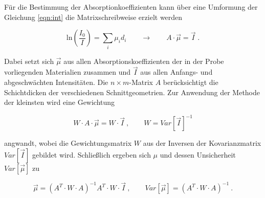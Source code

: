 Für die Bestimmung der Absorptionkoeffizienten kann über eine Umformung der Gleichung \eqref{eqn:int}
die Matrixschreibweise erzielt werden

\begin{equation}
    \text{ln} \left(\frac{I_0}{I}\right) = \sum_i \mu_i d_i \qquad \to \qquad A \cdot \vec{\mu} = \vec{I} \; .
\end{equation}

Dabei setzt sich $\vec{\mu}$ aus allen Absorptionskoeffizienten der in der Probe vorliegenden Materialien zusammen
und $\vec{I}$ aus allen Anfangs- und abgeschwächten Intensitäten. Die $n \times m$-Matrix $A$ berücksichtigt die Schichtdicken
der verschiedenen Schnittgeometrien. 
Zur Anwendung der Methode der kleinsten wird eine Gewichtung 

\begin{equation}
    W \cdot A \cdot \vec{\mu} = W \cdot \vec{I} \:, \qquad W = Var[\vec{I}]^{-1}
\end{equation}

angwandt, wobei die Gewichtungsmatrix $W$ aus der Inversen der Kovarianzmatrix $Var[\vec{I}]$ gebildet wird.
Schließlich ergeben sich $\mu$ und dessen Unsicherheit $Var[\vec{\mu}]$ zu

\begin{equation}
    \vec{\mu} = \left(A^T \cdot W \cdot A\right)^{-1} A^T \cdot W \cdot \vec{I}\:, \qquad Var[\vec{\mu}] = \left(A^T \cdot W \cdot A\right)^{-1} \: .
    \label{eqn:Abs}
\end{equation}

